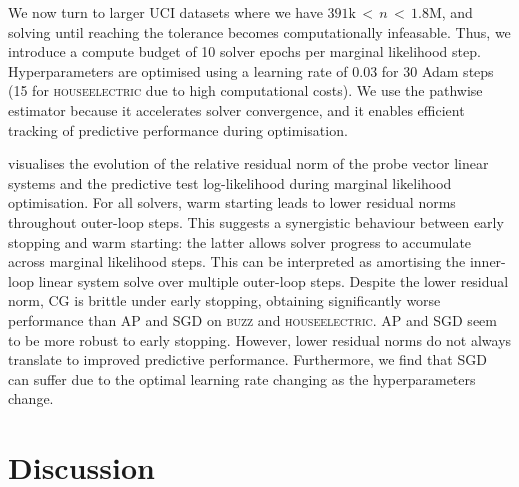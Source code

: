 We now turn to larger UCI datasets where we have $391\text{k} {\,<\,} n {\,<\,} 1.8\text{M}$, and solving until reaching the tolerance becomes computationally infeasable. Thus, we introduce a compute budget of 10 solver epochs per marginal likelihood step.
Hyperparameters are optimised using a learning rate of 0.03 for 30 Adam steps (15 for \textsc{houseelectric} due to high computational costs).
We use the pathwise estimator because it accelerates solver convergence, and it enables efficient tracking of predictive performance during optimisation.

 visualises the evolution of the relative residual norm of the probe vector linear systems and the predictive test log-likelihood during marginal likelihood optimisation.
For all solvers, warm starting leads to lower residual norms throughout outer-loop steps.
This suggests a synergistic behaviour between early stopping and warm starting: the latter allows solver progress to accumulate across marginal likelihood steps.
This can be interpreted as amortising the inner-loop linear system solve over multiple outer-loop steps.
Despite the lower residual norm, CG is brittle under early stopping, obtaining significantly worse performance than AP and SGD on \textsc{buzz} and \textsc{houseelectric}. 
AP and SGD seem to be more robust to early stopping.
However, lower residual norms do not always translate to improved predictive performance.
Furthermore, we find that SGD can suffer due to the optimal learning rate changing as the hyperparameters change.

\section{Discussion}


